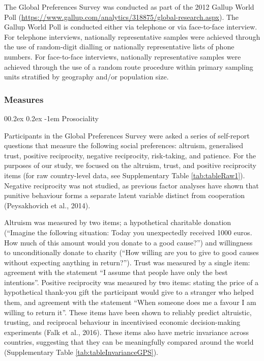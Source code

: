 \documentclass[
  man,floatsintext]{apa6}
\makeatletter
\let\oldparagraph\paragraph
\renewcommand{\paragraph}[1]{\oldparagraph{#1}\mbox{}}
\renewcommand{\paragraph}{\@startsection{paragraph}{4}{\parindent}%
  {0\baselineskip \@plus 0.2ex \@minus 0.2ex}%
  {-1em}%
  {\normalfont\normalsize\bfseries\itshape\typesectitle}}
\makeatother
\begin{document}
The Global Preferences Survey was conducted as part of the 2012 Gallup World Poll (\url{https://www.gallup.com/analytics/318875/global-research.aspx}). The Gallup World Poll is conducted either via telephone or via face-to-face interview. For telephone interviews, nationally representative samples were achieved through the use of random-digit dialling or nationally representative lists of phone numbers. For face-to-face interviews, nationally representative samples were achieved through the use of a random route procedure within primary sampling units stratified by geography and/or population size.

\hypertarget{measures}{%
\subsubsection{Measures}\label{measures}}

\hypertarget{prosociality}{%
\paragraph{Prosociality}\label{prosociality}}

Participants in the Global Preferences Survey were asked a series of self-report questions that measure the following social preferences: altruism, generalised trust, positive reciprocity, negative reciprocity, risk-taking, and patience. For the purposes of our study, we focused on the altruism, trust, and positive reciprocity items (for raw country-level data, see Supplementary Table \ref{tab:tableRaw1}). Negative reciprocity was not studied, as previous factor analyses have shown that punitive behaviour forms a separate latent variable distinct from cooperation (Peysakhovich et al., 2014).

Altruism was measured by two items; a hypothetical charitable donation (``Imagine the following situation: Today you unexpectedly received 1000 euros. How much of this amount would you donate to a good cause?'') and willingness to unconditionally donate to charity (``How willing are you to give to good causes without expecting anything in return?''). Trust was measured by a single item: agreement with the statement ``I assume that people have only the best intentions''. Positive reciprocity was measured by two items: stating the price of a hypothetical thank-you gift the participant would give to a stranger who helped them, and agreement with the statement ``When someone does me a favour I am willing to return it''. These items have been shown to reliably predict altruistic, trusting, and reciprocal behaviour in incentivised economic decision-making experiments (Falk et al., 2016). These items also have metric invariance across countries, suggesting that they can be meaningfully compared around the world (Supplementary Table \ref{tab:tableInvarianceGPS}).
\end{document}
